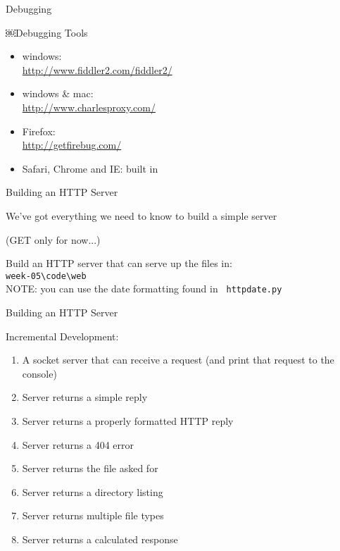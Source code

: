 \documentclass{beamer}
\begin{document}
\begin{frame}[fragile]{Debugging}

{\Large￼Debugging Tools}

\begin{itemize}
  \item windows:\\
    \url{http://www.fiddler2.com/fiddler2/}
  \item windows \& mac:\\
    \url{http://www.charlesproxy.com/}
  \item Firefox:\\ 
    \url{http://getfirebug.com/}
  \item Safari, Chrome and IE: built in
\end{itemize}

\end{frame}


\begin{frame}[fragile]{Building an HTTP Server}

\vfill
{\Large We've got everything we need to know to build a simple server}

\vfill
(GET only for now...)

\vfill
{\Large Build an HTTP server that can serve up the files in: \\[0.1in]
\verb|week-05\code\web|}\\

\vfill
NOTE: you can use the date formatting found in \verb| httpdate.py |
\end{frame}



\begin{frame}{Building an HTTP Server}

{\Large Incremental Development:}
\begin{enumerate}
  \item A socket server that can receive a request (and print that request to the console)
  \item Server returns a simple reply
  \item Server returns a properly formatted HTTP reply
  \item Server returns a 404 error
  \item Server returns the file asked for
  \item Server returns a directory listing
  \item Server returns multiple file types
  \item Server returns a calculated response
\end{enumerate}

\end{frame}
\end{document}
